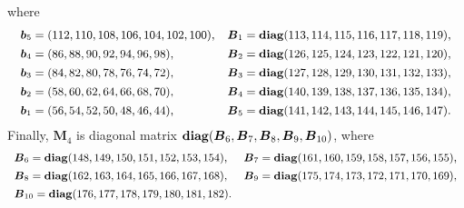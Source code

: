 \documentclass[12pt]{article}
\begin{document}
where
\begin{equation*}
	\small
	\begin{array}{ll}
		\boldsymbol{b}_{5}=(112,110,108,106,104,102,100),
		& \boldsymbol{B}_{1}={\rm\bf diag}(113,114,115,116,117,118,119),\\[4pt]
		\boldsymbol{b}_{4}=(86,88,90,92,94,96,98), &\boldsymbol{B}_{2}={\rm\bf diag}(126,125,124,123,122,121,120),\\[4pt] 
		\boldsymbol{b}_{3}=(84,82,80,78,76,74,72), 
		&\boldsymbol{B}_{3}={\rm\bf diag}(127,128,129,130,131,132,133),\\[4pt]
		\boldsymbol{b}_{2}=(58,60,62,64,66,68,70),
		&\boldsymbol{B}_{4}={\rm\bf diag}(140,139,138,137,136,135,134),\\[4pt] 
		\boldsymbol{b}_{1}=(56,54,52,50,48,46,44),
		&\boldsymbol{B}_{5}={\rm\bf diag}(141,142,143,144,145,146,147).
	\end{array}
\end{equation*}
Finally, $\boldsymbol{M}_{4}$ is diagonal matrix ${\rm\bf diag}(\boldsymbol{B}_{6},\boldsymbol{B}_{7},\boldsymbol{B}_{8},\boldsymbol{B}_{9},\boldsymbol{B}_{10})$, where
\begin{equation*}
	\small
	\begin{array}{ll}
		\boldsymbol{B}_{6}={\rm\bf diag}(148,149,150,151,152,153,154),
		& \boldsymbol{B}_{7}={\rm\bf diag}(161,160,159,158,157,156,155),\\[4pt]
		\boldsymbol{B}_{8}={\rm\bf diag}(162,163,164,165,166,167,168), &\boldsymbol{B}_{9}={\rm\bf diag}(175,174,173,172,171,170,169),\\[4pt] 
		\boldsymbol{B}_{10}={\rm\bf diag}(176,177,178,179,180,181,182).
	\end{array}
\end{equation*}
\end{document}
